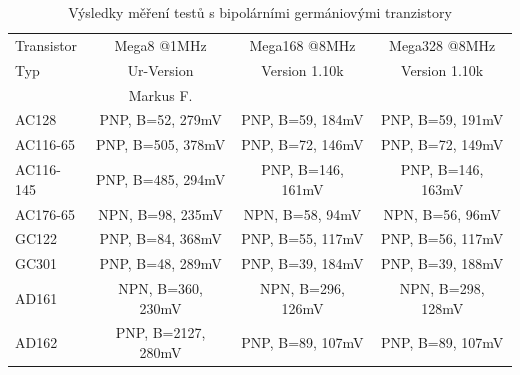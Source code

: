 \begin{table}[H]
  \begin{center}
    \begin{tabular}{| l | c | c | c |}
    \hline
 Transistor & Mega8 @1MHz          & Mega168 @8MHz       & Mega328 @8MHz    \\
    Typ     & Ur-Version          & Version 1.10k       & Version 1.10k  \\
            & Markus F.           &                     &        \\
    \hline
    \hline
AC128       & PNP, B=52, 279mV    & PNP, B=59, 184mV    & PNP, B=59, 191mV    \\
    \hline
AC116-65    & PNP, B=505, 378mV   & PNP, B=72, 146mV    & PNP, B=72, 149mV    \\
    \hline
AC116-145   & PNP, B=485, 294mV   & PNP, B=146, 161mV    & PNP, B=146, 163mV   \\
    \hline
AC176-65    & NPN, B=98, 235mV    & NPN, B=58, 94mV    & NPN, B=56, 96mV     \\
    \hline
GC122       & PNP, B=84, 368mV    & PNP, B=55, 117mV    & PNP, B=56, 117mV    \\
    \hline
GC301       & PNP, B=48, 289mV    & PNP, B=39, 184mV    & PNP, B=39, 188mV    \\
    \hline
AD161       & NPN, B=360, 230mV   & NPN, B=296, 126mV   & NPN, B=298, 128mV    \\
    \hline
AD162       & PNP, B=2127, 280mV  & PNP, B=89, 107mV    & PNP, B=89, 107mV    \\
    \hline
    \end{tabular}
  \end{center}
  \caption{Výsledky měření testů s bipolárními germániovými tranzistory}
  \label{tab:germanium} 
\end{table}

